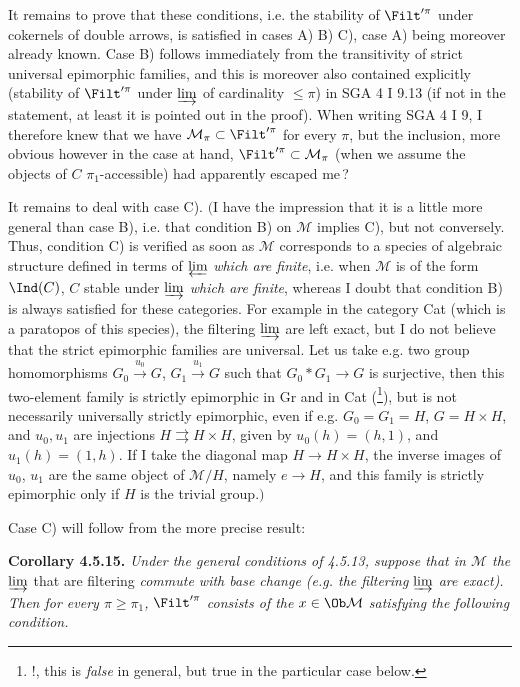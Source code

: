 It remains to prove that these conditions, i.e. the stability of $\Filt'^{\pi}$ under cokernels of double arrows, is satisfied in cases A) B) C), case A) being moreover already known. Case B) follows immediately from the transitivity of strict universal epimorphic families, and this is moreover also contained explicitly (stability of $\Filt'^{\pi}$ under $\varinjlim$ of cardinality $\leqslant \pi$) in SGA 4 I 9.13 (if not in the statement, at least it is pointed out in the proof). When writing SGA 4 I 9, I therefore knew that we have $\mathcal{M}_{\pi} \subset \Filt'^{\pi}$ for every $\pi$, but the inclusion, more obvious however in the case at hand, $\Filt'^{\pi} \subset \mathcal{M}_{\pi}$ (when we assume the objects of $C$ $\pi_1$-accessible) had apparently escaped me\,?

It remains to deal with case C). $\Big($I have the impression that it is a little more general than case B), i.e. that condition B) on $\mathcal{M}$ implies C), but not conversely. Thus, condition C) is verified as soon as $\mathcal{M}$ corresponds to a species of algebraic structure defined in
terms of $\varprojlim$ \textit{which are finite}, i.e. when $\mathcal{M}$ is of the form $\Ind(C)$, $C$ stable under $\varinjlim$ \textit{which are finite}, whereas I doubt that condition B) is always satisfied for these categories. For example in the category Cat (which is a paratopos of this species), the filtering $\varinjlim$ are left exact, but I do not believe that the strict epimorphic families are universal. %
Let us take e.g. two group homomorphisms $G_0 \xrightarrow{u_0} G$, $G_1 \xrightarrow{u_1} G$ such that $G_0 * G_1 \longrightarrow G$ is surjective, then this two-element family is strictly epimorphic in Gr and in Cat (\footnote{!, this is \textit{false} in general, but true in the particular case below.}), but is not necessarily universally strictly epimorphic, even if e.g. $G_0 = G_1 = H$, $G = H \times H$, and $u_0, u_1$ are injections $H \rightrightarrows H \times H$, given by $u_0(h) = (h,1)$, and $u_1(h) = (1,h)$. If I take the diagonal map $H \longrightarrow H \times H$, the inverse images of $u_0$, $u_1$ are the same object of $\mathcal{M}/H$, namely $e \longrightarrow H$, and this family is strictly epimorphic only if $H$ is the trivial group.$\Big)$

Case C) will follow from the more precise result:

\textbf{Corollary 4.5.15.} \textit{Under the general conditions of 4.5.13, suppose that in $\mathcal{M}$ the} $\varinjlim$
that are filtering \textit{commute with base change (e.g. the filtering} $\varinjlim$ \textit{are exact). Then for every $\pi \geqslant \pi_1$,} $\Filt'^{\pi}$ \textit{consists of the $x \in \Ob \mathcal{M}$ satisfying the following condition.}

